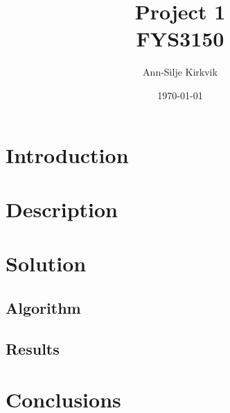 \documentclass{article}
\begin{document}
\title{Project 1 \\ FYS3150}

\author{Ann-Silje Kirkvik}
\date{\today}

\maketitle

\newpage

\section{Introduction}



\section{Description}

\section{Solution}

\subsection{Algorithm}

\subsection{Results}

\section{Conclusions}
\end{document}
